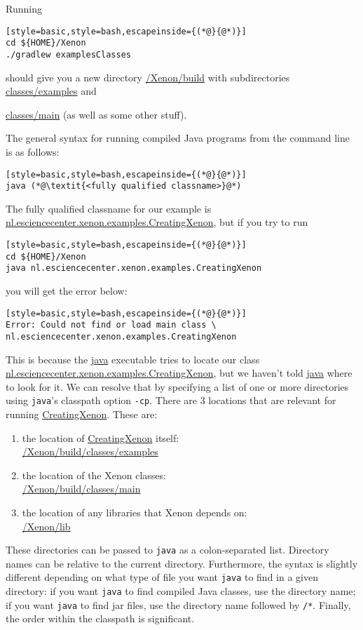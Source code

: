 Running
\begin{lstlisting}[style=basic,style=bash,escapeinside={(*@}{@*)}]
cd ${HOME}/Xenon
./gradlew examplesClasses
\end{lstlisting} %
should give you a new directory \mytilde\url{/Xenon/build} with subdirectories \url{classes/examples} and {\url{classes/main} (as well as some other stuff).


The general syntax for running compiled Java programs from the command line is as follows:
\begin{lstlisting}[style=basic,style=bash,escapeinside={(*@}{@*)}]
java (*@\textit{<fully qualified classname>}@*)
\end{lstlisting}
The fully qualified classname for our example is \url{nl.esciencecenter.xenon.examples.CreatingXenon}, but if you try to run
\begin{lstlisting}[style=basic,style=bash,escapeinside={(*@}{@*)}]
cd ${HOME}/Xenon
java nl.esciencecenter.xenon.examples.CreatingXenon
\end{lstlisting} %
you will get the error below:
\begin{lstlisting}[style=basic,style=bash,escapeinside={(*@}{@*)}]
Error: Could not find or load main class \
nl.esciencecenter.xenon.examples.CreatingXenon
\end{lstlisting}

This is because the \url{java} executable tries to locate our class \url{nl.esciencecenter.xenon.examples.CreatingXenon}, but we haven't told \url{java} where to look for it. We can resolve that by specifying a list of one or more directories using \texttt{java}'s classpath option \texttt{-cp}. There are 3 locations that are relevant for running \url{CreatingXenon}. These are:
\begin{enumerate}
\item{the location of \url{CreatingXenon} itself:\\ \mytilde\url{/Xenon/build/classes/examples}}
\item{the location of the Xenon classes:\\ \mytilde\url{/Xenon/build/classes/main}}
\item{the location of any libraries that Xenon depends on:\\ \mytilde\url{/Xenon/lib}}
\end{enumerate}
These directories can be passed to \texttt{java} as a colon-separated list. Directory names can be relative to the current directory. Furthermore, the syntax is slightly different depending on what type of file you want \texttt{java} to find in a given directory: if you want \texttt{java} to find compiled Java classes, use the directory name; if you want \texttt{java} to find jar files, use the directory name followed by \texttt{/*}. Finally, the order within the classpath is significant.

}
